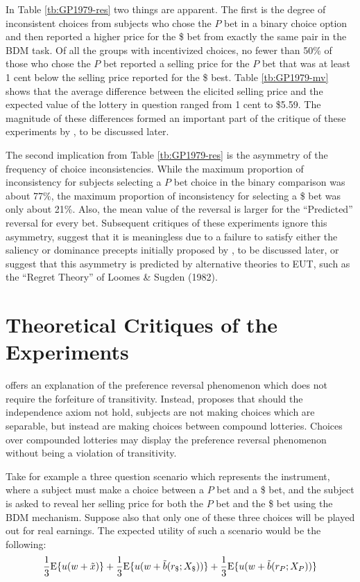 \documentclass[../main.tex]{subfiles}
\begin{document}
In Table \ref{tb:GP1979-res} two things are apparent.
The first is the degree of inconsistent choices from subjects who chose the $P$ bet in a binary choice option and then reported a higher price for the {\$} bet from exactly the same pair in the BDM task.
Of all the groups with incentivized choices, no fewer than 50\% of those who chose the $P$ bet reported a selling price for the $P$ bet that was at least 1 cent below the selling price reported for the {\$} best.
Table \ref{tb:GP1979-mv} shows that the average difference between the elicited selling price and the expected value of the lottery in question ranged from 1 cent to \${5.59}.
The magnitude of these differences formed an important part of the critique of these experiments by \textcite{Harrison1989, Harrison1992}, to be discussed later.

The second implication from Table \ref{tb:GP1979-res} is the asymmetry of the frequency of choice inconsistencies.
While the maximum proportion of inconsistency for subjects selecting a $P$ bet choice in the binary comparison was about 77\%, the maximum proportion of inconsistency for selecting a {\$} bet was only about 21\%.
Also, the  mean value of the reversal is larger for the \enquote{Predicted} reversal for every bet.
Subsequent critiques of these experiments ignore this asymmetry, suggest that it is meaningless due to a failure to satisfy either the saliency or dominance precepts initially proposed by \textcite{Smith1982}, to be discussed later, or suggest that this asymmetry is predicted by alternative theories to EUT, such as the \enquote{Regret Theory} of  Loomes \& Sugden (1982).

\singlespacing
\section{Theoretical Critiques of the \texorpdfstring{\textcite{Grether1979}}{Grether \& Plott (1979)} Experiments}
\doublespacing

\textcite{Holt1986} offers an explanation of the preference reversal phenomenon which does not require the forfeiture of transitivity.
Instead, \textcite{Holt1986} proposes that should the independence axiom not hold, subjects are not making choices which are separable, but instead are making choices between compound lotteries.
Choices over compounded lotteries may display the preference reversal phenomenon without being a violation of transitivity.

Take for example a three question scenario which represents the \textcite{Grether1979} instrument, where a subject must make a choice between a $P$ bet and a {\$} bet, and the subject is asked to reveal her selling price for both the $P$ bet and the {\$} bet using the BDM mechanism.
Suppose also that only one of these three choices will be played out for real earnings.
The expected utility of such a scenario would be the following:
\begin{equation}
	\label{eq:GP-EU}
	\frac{1}{3}{\operatorname{E}}{\lbrace} u(w+\tilde{x}){\rbrace} + \frac{1}{3}{\operatorname{E}}{\lbrace} u(w+\tilde{b}(r_{\$};X_{\$})){\rbrace} + \frac{1}{3}{\operatorname{E}}{\lbrace} u(w+\tilde{b}(r_P;X_P)){\rbrace}
\end{equation}
\end{document}
